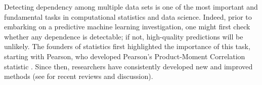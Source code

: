 \documentclass[11pt]{article}
\begin{document}
\setcounter{tocdepth}{2}%





{}



Detecting dependency among multiple data sets is one of the most important and fundamental tasks in computational statistics and data science.
Indeed, prior to embarking on a predictive machine learning investigation, one might first check whether any dependence is detectable; if not, high-quality predictions will be unlikely.
The founders of statistics first highlighted the importance of this task, starting with Pearson, who developed Pearson's Product-Moment Correlation statistic  \cite{Pearson1895}.  Since then, researchers have consistently developed new and improved methods (see \cite{Reimherr2013,JosseHolmes2013} for  recent reviews and discussion).
\end{document}
